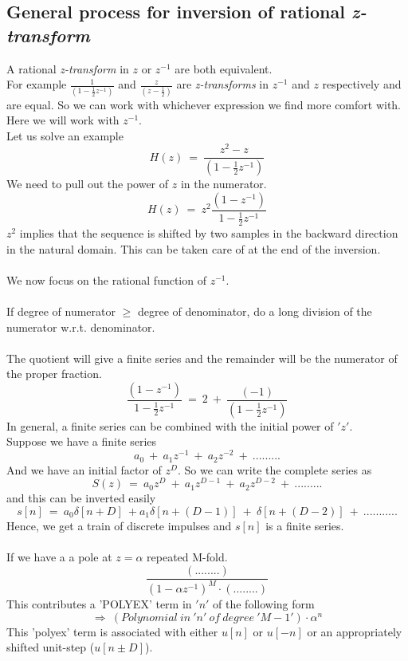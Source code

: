 \subsection{General process for inversion of rational \textit{z-transform}}
A rational \textit{z-transform} in $z$ or $z^{-1}$ are both equivalent.\\
For example $\frac{1}{(1 - \frac{1}{2}z^{-1})}$ and $\frac{z}{(z - \frac{1}{2})}$ are \textit{z-transforms} in $z^{-1}$ and $z$ respectively and are equal. So we can work with whichever expression we find more comfort with. Here we will work with $z^{-1}$.\\

Let us solve an example
\[
H(z)\ =\ \frac{z^2 - z}{(1 - \frac{1}{2}z^{-1})}
\]
We need to pull out the power of $z$ in the numerator.
\[
H(z)\ =\ z^2\frac{(1 - z^{-1})}{1 - \frac{1}{2}z^{-1}}
\]
$z^2$ implies that the sequence is shifted by two samples in the backward direction in the natural domain. This can be taken care of at the end of the inversion.\\\\
We now focus on the rational function of $z^{-1}$.\\\\
If degree of numerator $\geq$ degree of denominator, do a long division of the numerator w.r.t. denominator.\\\\
The quotient will give a finite series and the remainder will be the numerator of the proper fraction.
\[
\frac{(1 - z^{-1})}{1 - \frac{1}{2}z^{-1}}\ =\ 2\ +\ \frac{(-1)}{(1 - \frac{1}{2}z^{-1})}
\]
In general, a finite series can be combined with the initial power of $'z'$.\\
Suppose we have a finite series \[a_0\ +\ a_1z^{-1}\ +\ a_2z^{-2}\ +\ .........\]
And we have an initial factor of $z^D$. So we can write the complete series as
\[ S(z)\ =\ a_0z^D\ +\ a_1z^{D-1}\ +\ a_2z^{D-2}\ +\ .........\]
and this can be inverted easily
\[ s[n]\ =\ a_0\delta[n+D]\ + a_1\delta[n+(D-1)]\ +\ \delta[n+(D-2)]\ +\ ...........\] 
Hence, we get a train of discrete impulses and $s[n]$ is a finite series.\\\\
If we have a a pole at $ z = \alpha $ repeated M-fold.
\[ \frac{(........)}{(1 - \alpha z^{-1})^M\cdot(........)}\]
This contributes a 'POLYEX' term in $'n'$ of the following form
\[\Rightarrow\ (Polynomial\ in\ 'n'\ of\ degree\ 'M-1')\cdot\alpha^n\]
This 'polyex' term is associated with either $u[n]$ or $u[-n]$ or an appropriately shifted unit-step ($u[n\pm D]$).\\
